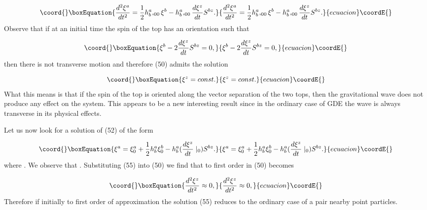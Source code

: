 \documentclass[a4paper,12pt]{article}
\begin{document}
\begin{equation}\coord{}\boxEquation{
\frac{d^{2}\xi ^{a}}{dt^{2}}=\frac{1}{2}h_{b}^{a},_{00}\xi
^{b}-h_{b}^{a},_{00}\frac{d\xi ^{z}}{dt}S^{bz}.  \label{52}
}{
\frac{d^{2}\xi ^{a}}{dt^{2}}=\frac{1}{2}h_{b}^{a},_{00}\xi
^{b}-h_{b}^{a},_{00}\frac{d\xi ^{z}}{dt}S^{bz}.  }{ecuacion}\coordE{}\end{equation}
Observe that if at an initial time the spin of the top \coordHE{} has an
orientation such that

\begin{equation}\coord{}\boxEquation{
\xi^{b}-2\frac{d\xi^{z}}{dt}S^{bz}=0,  \label{53}
}{
\xi^{b}-2\frac{d\xi^{z}}{dt}S^{bz}=0,  }{ecuacion}\coordE{}\end{equation}
then there is not transverse motion \coordHE{} and therefore (50)
admits the solution

\begin{equation}\coord{}\boxEquation{
\xi ^{z}=const.  \label{54}
}{
\xi ^{z}=const.  }{ecuacion}\coordE{}\end{equation}
What this means is that if the spin of the top is oriented along the vector
separation \coordHE{} of the two tops, then the gravitational wave does not
produce any effect on the system. This appears to be a new interesting
result since in the ordinary case of GDE the wave is always transverse in
its physical effects.

Let us now look for a solution of (52) of the form

\begin{equation}\coord{}\boxEquation{
\xi ^{a}=\xi _{0}^{a}+\frac{1}{2}h_{b}^{a}\xi _{0}^{b}-h_{b}^{a}(\frac{d\xi
^{z}}{dt}\mid _{0})S^{bz}.  \label{55}
}{
\xi ^{a}=\xi _{0}^{a}+\frac{1}{2}h_{b}^{a}\xi _{0}^{b}-h_{b}^{a}(\frac{d\xi
^{z}}{dt}\mid _{0})S^{bz}.  }{ecuacion}\coordE{}\end{equation}
where \coordHE{}. We observe that \coordHE{}. Substituting (55) into (50) we find that to first order in \coordHE{}
(50) becomes

\begin{equation}\coord{}\boxEquation{
\frac{d^{2}\xi ^{z}}{dt^{2}}\approx 0,  \label{56}
}{
\frac{d^{2}\xi ^{z}}{dt^{2}}\approx 0,  }{ecuacion}\coordE{}\end{equation}
Therefore if initially \coordHE{} to first order of
approximation the solution (55) reduces to the ordinary case of a pair
nearby point particles.
\end{document}
